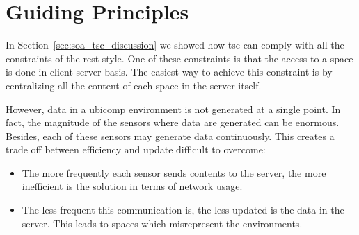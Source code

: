 \section{Guiding Principles} %
\label{sec:guiding_principles}

In Section~\ref{sec:soa_tsc_discussion} we showed how \ac{tsc} can comply with all the constraints of the \ac{rest} style.
One of these constraints is that the access to a space is done in client-server basis.
The easiest way to achieve this constraint is by centralizing all the content of each space in the server itself.


However, data in a \ac{ubicomp} environment is not generated at a single point. %
In fact, the magnitude of the sensors where data are generated can be enormous. %
Besides, each of these sensors may generate data continuously.
This creates a trade off between efficiency and update difficult to overcome:
\begin{itemize}
  \item The more frequently each sensor sends contents to the server, the more inefficient is the solution in terms of network usage.
  \item The less frequent this communication is, the less updated is the data in the server.
        This leads to spaces which misrepresent the environments.
\end{itemize}



